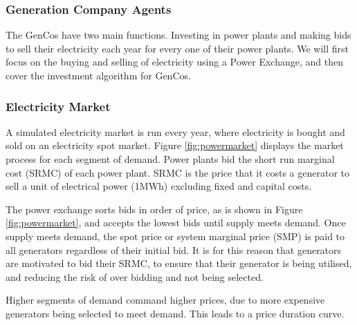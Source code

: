 \subsubsection{Generation Company Agents} The GenCos have two main functions. Investing in power plants and making bids to sell their electricity each year for every one of their power plants. We will first focus on the buying and selling of electricity using a Power Exchange, and then cover the investment algorithm for GenCos.

\subsubsection{Electricity Market} \label{sssec:electricity_market} A simulated electricity market is run every year, where electricity is bought and sold on an electricity spot market. Figure \ref{fig:powermarket} displays the market process for each segment of demand. Power plants bid the short run marginal cost (SRMC) of each power plant. SRMC is the price that it costs a generator to sell a unit of electrical power (1MWh) excluding fixed and capital costs. 

The power exchange sorts bids in order of price, as is shown in Figure \ref{fig:powermarket}, and accepts the lowest bids until supply meets demand. Once supply meets demand, the spot price or system marginal price (SMP) is paid to all generators regardless of their initial bid. It is for this reason that generators are motivated to bid their SRMC, to ensure that their generator is being utilised, and reducing the risk of over bidding and not being selected.

Higher segments of demand command higher prices, due to more expensive generators being selected to meet demand. This leads to a price duration curve.
 

